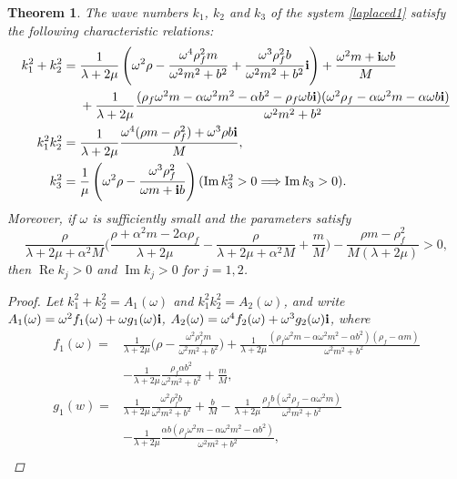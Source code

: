 \documentclass[11pt]{article}
\newcommand{\la}{\lambda}
\newtheorem{theorem}{Theorem}[section]
\providecommand{\Rp}{\operatorname{Re}}%
\providecommand{\Ip}{\operatorname{Im}}%
\begin{document}
\begin{theorem}\label{wavenumber}
The wave numbers $k_1$, $k_2$ and $k_3$ of the system \eqref{laplaced1} satisfy the following characteristic relations:
\begin{equation}\label{k1k2}
\begin{aligned}
k_1^2+k_2^2
=\;&\frac{1}{\la+2\mu}\left(\omega^2\rho -\frac{\omega^4\rho_f^2 m}{\omega^2m^2+b^2}
+\frac{\omega^3\rho_f^2 b}{\omega^2m^2+b^2}{\bf{i}}\right)+\frac{\omega^2m+{\bf{i}}\omega b}{M}\\ 
&+\frac{1}{\la+2\mu}\frac{(\rho_f\omega^2m-\alpha \omega^2m^2-\alpha b^2-\rho_f\omega b {\bf{i}})
(\omega^2\rho_f -\alpha \omega^2m-\alpha \omega b{\bf{i}})}{\omega^2m^2+b^2}\\
k_1^2k_2^2
=\;&\frac{1}{\la+2\mu}\frac{\omega^4(\rho m-\rho_f^2)+\omega^3\rho b {\bf{i}}}{M},\\
k_3^2 =\;& \frac{1}{\mu}\left(\omega^2 \rho -\frac{\omega^3 \rho_f^2}{{\omega m+\bf{i}}b}\right) 
(\Ip k_3^2>0 \Longrightarrow \Ip k_3>0).
\end{aligned}
\end{equation}
Moreover, if $\omega$ is sufficiently small and the parameters satisfy
\begin{equation}\label{wavenumbercondition}
\frac{\rho}{\la+2\mu+\alpha^2M}\Big(\frac{\rho+\alpha^2m-2\alpha \rho_f}{\la+2\mu}-\frac{\rho}
{\la+2\mu+\alpha^2M}+\frac{m}{M}\Big)-\frac{\rho m-\rho_f^2}{M(\la+2\mu)}>0,
\end{equation}
then $\Rp k_j>0$ and $\Ip k_j>0$ for $j=1,2$.
\begin{proof}
Let $k_1^2+k_2^2=A_1(\omega)$ and $k_1^2k_2^2=A_2(\omega)$, and write
$A_1(\omega)=\omega^2f_1(\omega)+\omega g_1(\omega){\bf{i}}$, $A_2(\omega)
=\omega^4f_2(\omega)+\omega^3 g_2(\omega){\bf{i}}$, where
\begin{equation}\label{fg}
\begin{aligned}
f_1(\omega)=&\frac{1}{\la+2\mu}\Big(\rho -\frac{\omega^2\rho_f^2 m}{\omega^2m^2+b^2}\Big)
+\frac{1}{\la+2\mu}\frac{(\rho_f\omega^2m-\alpha \omega^2m^2-\alpha b^2)(\rho_f -\alpha m)}{\omega^2m^2+b^2}\\
&-\frac{1}{\la+2\mu}\frac{\rho_f\alpha b^2}{\omega^2m^2+b^2} + \frac{m}{M},\\
g_1(w)=&\frac{1}{\la+2\mu}\frac{\omega^2\rho_f^2 b}{\omega^2m^2+b^2}+\frac{ b}{M}
-\frac{1}{\la+2\mu}\frac{\rho_f b(\omega^2\rho_f -\alpha \omega^2m)}{\omega^2m^2+b^2}\\
&-\frac{1}{\la+2\mu}\frac{\alpha b(\rho_f\omega^2m-\alpha \omega^2m^2-\alpha b^2)}{\omega^2m^2+b^2},\\

\end{aligned}
\end{equation}
\end{proof}
\end{theorem}
\end{document}
